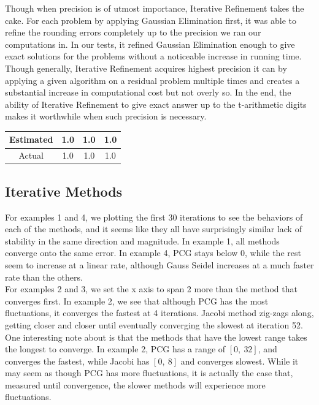 \documentclass[11pt]{article}	%
\begin{document}
Though when precision is of utmost importance, Iterative Refinement takes the cake. For each problem by applying Gaussian Elimination first, it was able to refine the rounding errors completely up to the precision we ran our computations in. In our tests, it refined Gaussian Elimination enough to give exact solutions for the problems without a noticeable increase in running time. Though generally, Iterative Refinement acquires highest precision it can by applying a given algorithm on a residual problem multiple times and creates a substantial increase in computational cost but not overly so. In the end, the ability of Iterative Refinement to give exact answer up to the t-arithmetic digits makes it worthwhile when such precision is necessary.

\begin{center}
	 \label{tab:title}
    \begin{tabular}{||c|c|c|c||}
        \hline
        Estimated & 1.0 & 1.0 &  1.0 \\ [.25em]
        \hline\hline
        Actual & 1.0 & 1.0 & 1.0 \\ [.25em]
        \hline
    \end{tabular}
\end{center}

\subsection{Iterative Methods}
For examples 1 and 4, we plotting the first 30 iterations to see the behaviors of each of the methods, and it seems like they all have surprisingly similar lack of stability in the same direction and magnitude. In example 1, all methods converge onto the same error. In example 4, PCG stays below 0, while the rest seem to increase at a linear rate, although Gauss Seidel increases at a much faster rate than the others.\\

\noindent For examples 2 and 3, we set the x axis to span 2 more than the method that converges first. In example 2, we see that although PCG has the most fluctuations, it converges the fastest at 4 iterations. Jacobi method zig-zags along, getting closer and closer until eventually converging the slowest at iteration 52.\\

\noindent One interesting note about is that the methods that have the lowest range takes the longest to converge. In example 2, PCG has a range of $[0, ~32]$, and converges the fastest, while Jacobi has $[0, ~8]$ and converges slowest. While it may seem as though PCG has more fluctuations, it is actually the case that, measured until convergence, the slower methods will experience more fluctuations.\\
\end{document}
